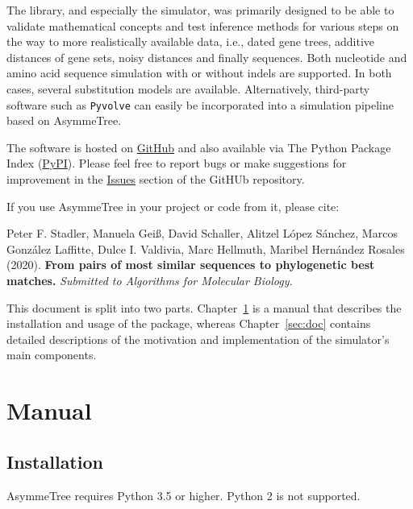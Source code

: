 \documentclass[hidelinks,11pt]{scrreprt}
\begin{document}
The library, and especially the simulator, was primarily designed to be able to validate mathematical concepts and test inference methods for various steps on the way to more realistically available data, i.e., dated gene trees, additive distances of gene sets, noisy distances and finally sequences.
Both nucleotide and amino acid sequence simulation with or without indels are supported. In both cases, several substitution models are available.
Alternatively, third-party software such as \texttt{Pyvolve} \cite{spielman2015} can easily be incorporated into a simulation pipeline based on AsymmeTree.

The software is hosted on \href{https://github.com/david-schaller/AsymmeTree}{GitHub} and also available via The Python Package Index (\href{https://pypi.org/project/asymmetree/}{PyPI}).
Please feel free to report bugs or make suggestions for improvement in the \href{https://github.com/david-schaller/AsymmeTree/issues}{Issues} section of the GitHUb repository.

If you use AsymmeTree in your project or code from it, please cite:

\vspace{3mm}
\begin{adjustwidth}{1cm}{1cm}
	Peter F. Stadler, Manuela Gei{\ss}, David Schaller, Alitzel L{\'o}pez S{\'a}nchez, Marcos Gonz{\'a}lez Laffitte, Dulce I. Valdivia, Marc Hellmuth, Maribel Hern{\'a}ndez Rosales (2020). \textbf{From pairs of most similar sequences to phylogenetic best matches.} \textit{Submitted to Algorithms for Molecular Biology.}
\end{adjustwidth}
\vspace{3mm}

This document is split into two parts. Chapter~\ref{sec:manual} is a manual that describes the installation and usage of the package, whereas Chapter~\ref{sec:doc} contains detailed descriptions of the motivation and implementation of the simulator's main components.

\chapter{Manual}\label{sec:manual}

\section{Installation}

AsymmeTree requires Python 3.5 or higher. Python 2 is not supported.
\end{document}
